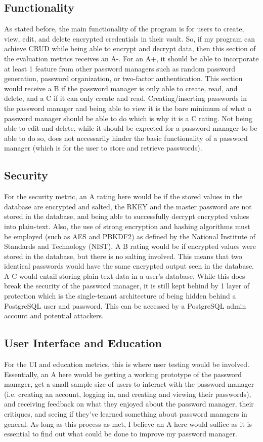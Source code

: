 \documentclass[10pt,twocolumn]{article}
\begin{document}
\subsection{Functionality}
As stated before, the main functionality of the program is for users to create, view, edit, and delete encrypted credentials in their vault. So, if my program can achieve CRUD while being able to encrypt and decrypt data, then this section of the evaluation metrics receives an A-. For an A+, it should be able to incorporate at least 1 feature from other password managers such as random password generation, password organization, or two-factor authentication. This section would receive a B if the password manager is only able to create, read, and delete, and a C if it can only create and read. Creating/inserting passwords in the password manager and being able to view it is the bare minimum of what a password manager should be able to do which is why it is a C rating. Not being able to edit and delete, while it should be expected for a password manager to be able to do so, does not necessarily hinder the basic functionality of a password manager (which is for the user to store and retrieve passwords). 

\subsection{Security}
For the security metric, an A rating here would be if the stored values in the database are encrypted and salted, the RKEY and the master password are not stored in the database, and being able to successfully decrypt encrypted values into plain-text. Also, the use of strong encryption and hashing algorithms must be employed (such as AES and PBKDF2) as defined by the National Institute of Standards and Technology (NIST)\cite{Computer_Security_Division}. A B rating would be if encrypted values were stored in the database, but there is no salting involved. This means that two identical passwords would have the same encrypted output seen in the database. A C would entail storing plain-text data in a user's database. While this does break the security of the password manager, it is still kept behind by 1 layer of protection which is the single-tenant architecture of being hidden behind a PostgreSQL user and password. This can be accessed by a PostgreSQL admin account and potential attackers.

\subsection{User Interface and Education}
For the UI and education metrics, this is where user testing would be involved. Essentially, an A here would be getting a working prototype of the password manager, get a small sample size of users to interact with the password manager (i.e. creating an account, logging in, and creating and viewing their passwords), and receiving feedback on what they enjoyed about the password manager, their critiques, and seeing if they've learned something about password managers in general. As long as this process as met, I believe an A here would suffice as it is essential to find out what could be done to improve my password manager.
\end{document}
